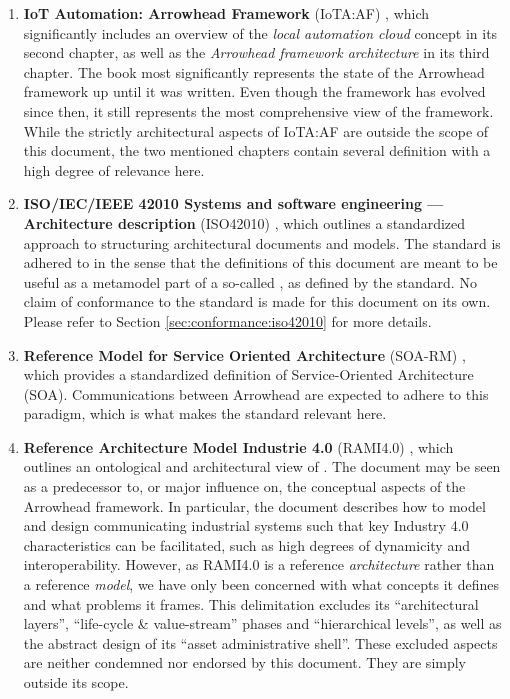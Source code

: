 \begin{enumerate}

\item \textbf{IoT Automation: Arrowhead Framework} (IoTA:AF) \cite{delsing2017iot}, which significantly includes an overview of the \textit{local automation cloud} concept in its second chapter, as well as the \textit{Arrowhead framework architecture} in its third chapter.
The book most significantly represents the state of the Arrowhead framework up until it was written.
Even though the framework has evolved since then, it still represents the most comprehensive view of the framework.
While the strictly architectural aspects of IoTA:AF are outside the scope of this document, the two mentioned chapters contain several definition with a high degree of relevance here.

\item \textbf{ISO/IEC/IEEE 42010 Systems and software engineering — Architecture description} (ISO42010) \cite{iso42010}, which outlines a standardized approach to structuring architectural documents and models.
The standard is adhered to in the sense that the definitions of this document are meant to be useful as a metamodel part of a so-called , as defined by the standard.
No claim of conformance to the standard is made for this document on its own.
Please refer to Section \ref{sec:conformance:iso42010} for more details.

\item \textbf{Reference Model for Service Oriented Architecture} (SOA-RM) \cite{mackenzie2006reference}, which provides a standardized definition of Service-Oriented Architecture (SOA).
Communications between Arrowhead  are expected to adhere to this paradigm, which is what makes the standard relevant here.

\item \textbf{Reference Architecture Model Industrie 4.0} (RAMI4.0) \cite{adolphs2016reference}, which outlines an ontological and architectural view of .
The document may be seen as a predecessor to, or major influence on, the conceptual aspects of the Arrowhead framework.
In particular, the document describes how to model and design communicating industrial systems such that key Industry 4.0 characteristics can be facilitated, such as high degrees of dynamicity and interoperability.
However, as RAMI4.0 is a reference \textit{architecture} rather than a reference \textit{model}, we have only been concerned with what concepts it defines and what problems it frames.
This delimitation excludes its ``architectural layers'', ``life-cycle \& value-stream'' phases and ``hierarchical levels'', as well as the abstract design of its ``asset administrative shell''.
These excluded aspects are neither condemned nor endorsed by this document.
They are simply outside its scope.

\end{enumerate}

